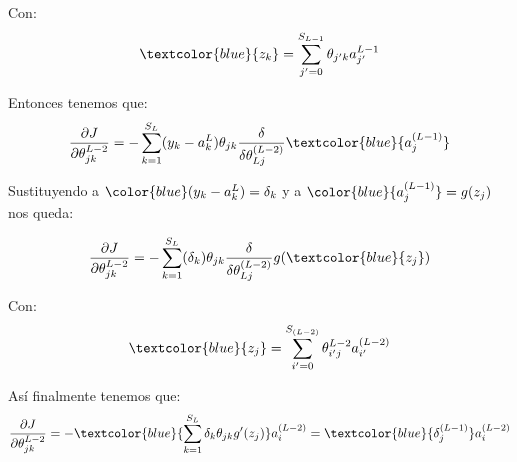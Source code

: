  Con:
 \begin{equation}
  \textcolor{blue}{z_{k}} = \sum_{j'=0}^{S_{L-1}}\theta_{j'k} a_{j'}^{L-1}
 \end{equation}

 Entonces tenemos que:
 \begin{equation}
 \dfrac{\partial J}{\partial \theta_{jk}^{L-2}}  =-\sum_{k=1}^{S_{L}}(y_{k}-a_{k}^{L})\theta_{jk}\dfrac{\delta}{\delta\theta_{Lj}^{(L-2)}} \textcolor{blue}{a_j^{(L-1)}}
 \end{equation}

Sustituyendo a $\color{blue} (y_{k}-a_{k}^{L}) = \delta_{k}$ y a $\color{blue}{a_j^{(L-1)}}= g(z_{j})$ nos queda: 

 \begin{equation}
  \dfrac{\partial J}{\partial \theta_{jk}^{L-2}} =-\sum_{k=1}^{S_{L}}(\delta_{k})\theta_{jk}\dfrac{\delta}{\delta\theta_{Lj}^{(L-2)}} g(\textcolor{blue}{z_{j}})
 \end{equation}
 
 Con:
 \begin{equation}
  \textcolor{blue}{z_{j}} = \sum_{i'=0}^{S_{(L-2)}}\theta_{i'j}^{L-2} a_{i'}^{(L-2)}
 \end{equation}

 Así finalmente tenemos que:
 \begin{equation}
 \dfrac{\partial J}{\partial \theta_{jk}^{L-2}} = - \textcolor{blue}{\sum_{k=1}^{S_{L}} \delta_{k}\theta_{jk}g'(z_{j})} a_{i}^{(L-2)} =  \textcolor{blue}{\delta_{j}^{(L-1)}} a_{i}^{(L-2)}
 \end{equation}

 

